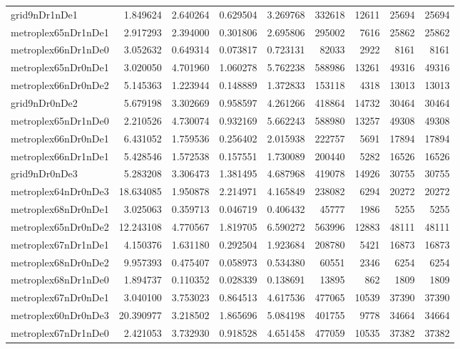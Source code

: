 \begin{longtable}{|l|r|r|r|r|r|r|r|r|}
grid9nDr1nDe1 & 1.849624 & 2.640264 & 0.629504 & 3.269768 & 332618 & 12611 & 25694 & 25694 \\
metroplex65nDr1nDe1 & 2.917293 & 2.394000 & 0.301806 & 2.695806 & 295002 & 7616 & 25862 & 25862 \\
metroplex66nDr1nDe0 & 3.052632 & 0.649314 & 0.073817 & 0.723131 & 82033 & 2922 & 8161 & 8161 \\
metroplex65nDr0nDe1 & 3.020050 & 4.701960 & 1.060278 & 5.762238 & 588986 & 13261 & 49316 & 49316 \\
metroplex66nDr0nDe2 & 5.145363 & 1.223944 & 0.148889 & 1.372833 & 153118 & 4318 & 13013 & 13013 \\
grid9nDr0nDe2 & 5.679198 & 3.302669 & 0.958597 & 4.261266 & 418864 & 14732 & 30464 & 30464 \\
metroplex65nDr1nDe0 & 2.210526 & 4.730074 & 0.932169 & 5.662243 & 588980 & 13257 & 49308 & 49308 \\
metroplex66nDr0nDe1 & 6.431052 & 1.759536 & 0.256402 & 2.015938 & 222757 & 5691 & 17894 & 17894 \\
metroplex66nDr1nDe1 & 5.428546 & 1.572538 & 0.157551 & 1.730089 & 200440 & 5282 & 16526 & 16526 \\
grid9nDr0nDe3 & 5.283208 & 3.306473 & 1.381495 & 4.687968 & 419078 & 14926 & 30755 & 30755 \\
metroplex64nDr0nDe3 & 18.634085 & 1.950878 & 2.214971 & 4.165849 & 238082 & 6294 & 20272 & 20272 \\
metroplex68nDr0nDe1 & 3.025063 & 0.359713 & 0.046719 & 0.406432 & 45777 & 1986 & 5255 & 5255 \\
metroplex65nDr0nDe2 & 12.243108 & 4.770567 & 1.819705 & 6.590272 & 563996 & 12883 & 48111 & 48111 \\
metroplex67nDr1nDe1 & 4.150376 & 1.631180 & 0.292504 & 1.923684 & 208780 & 5421 & 16873 & 16873 \\
metroplex68nDr0nDe2 & 9.957393 & 0.475407 & 0.058973 & 0.534380 & 60551 & 2346 & 6254 & 6254 \\
metroplex68nDr1nDe0 & 1.894737 & 0.110352 & 0.028339 & 0.138691 & 13895 & 862 & 1809 & 1809 \\
metroplex67nDr0nDe1 & 3.040100 & 3.753023 & 0.864513 & 4.617536 & 477065 & 10539 & 37390 & 37390 \\
metroplex60nDr0nDe3 & 20.390977 & 3.218502 & 1.865696 & 5.084198 & 401755 & 9778 & 34664 & 34664 \\
metroplex67nDr1nDe0 & 2.421053 & 3.732930 & 0.918528 & 4.651458 & 477059 & 10535 & 37382 & 37382 \\

\end{longtable}
